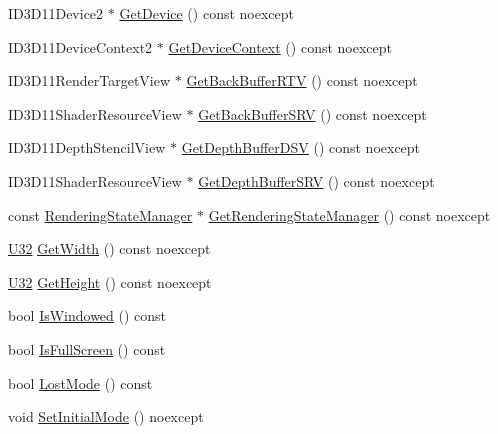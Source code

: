 \begin{DoxyCompactItemize}
\item 
I\+D3\+D11\+Device2 $\ast$ \hyperlink{classmage_1_1_rendering_manager_a9881f16fe6b212d4650f65e7a273b329}{Get\+Device} () const noexcept
\item 
I\+D3\+D11\+Device\+Context2 $\ast$ \hyperlink{classmage_1_1_rendering_manager_aac3ba0082e34614ce6bcef33fb89ce85}{Get\+Device\+Context} () const noexcept
\item 
I\+D3\+D11\+Render\+Target\+View $\ast$ \hyperlink{classmage_1_1_rendering_manager_ad423bcea3c7eb151d82a75ebc808fa24}{Get\+Back\+Buffer\+R\+TV} () const noexcept
\item 
I\+D3\+D11\+Shader\+Resource\+View $\ast$ \hyperlink{classmage_1_1_rendering_manager_a0c9d54f20055b68920bbf10811c11ce4}{Get\+Back\+Buffer\+S\+RV} () const noexcept
\item 
I\+D3\+D11\+Depth\+Stencil\+View $\ast$ \hyperlink{classmage_1_1_rendering_manager_a7c90cf73b8b8afd4fe6018bde7926cd2}{Get\+Depth\+Buffer\+D\+SV} () const noexcept
\item 
I\+D3\+D11\+Shader\+Resource\+View $\ast$ \hyperlink{classmage_1_1_rendering_manager_a703a1b27fb1523c2c2796a1dcd6e63d9}{Get\+Depth\+Buffer\+S\+RV} () const noexcept
\item 
const \hyperlink{structmage_1_1_rendering_state_manager}{Rendering\+State\+Manager} $\ast$ \hyperlink{classmage_1_1_rendering_manager_a762283c6474287a874f8e8667f69a165}{Get\+Rendering\+State\+Manager} () const noexcept
\item 
\hyperlink{namespacemage_a41c104c036fba3756a74e19f793eeaa1}{U32} \hyperlink{classmage_1_1_rendering_manager_a5ac88f86f2fe4ad4d13a5c3c4f0c4465}{Get\+Width} () const noexcept
\item 
\hyperlink{namespacemage_a41c104c036fba3756a74e19f793eeaa1}{U32} \hyperlink{classmage_1_1_rendering_manager_a72867cf717dc889c463fd55346ec8500}{Get\+Height} () const noexcept
\item 
bool \hyperlink{classmage_1_1_rendering_manager_a33b320769fa67b9ea7daf387422fc3d4}{Is\+Windowed} () const
\item 
bool \hyperlink{classmage_1_1_rendering_manager_ae3050ca59c06856a86254c06b6695d89}{Is\+Full\+Screen} () const
\item 
bool \hyperlink{classmage_1_1_rendering_manager_a046e763c36e64e87f3429e861308601e}{Lost\+Mode} () const
\item 
void \hyperlink{classmage_1_1_rendering_manager_a4a419cda665fd7a8c6605a67640dea01}{Set\+Initial\+Mode} () noexcept
\item 

\end{DoxyCompactItemize}
